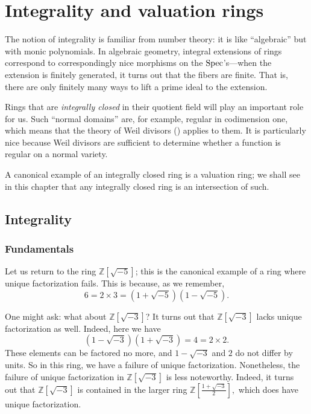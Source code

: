 \chapter{Integrality and valuation rings}

The notion of integrality is familiar from number theory: it is like
``algebraic'' but with monic polynomials. In algebraic geometry, integral
extensions of rings correspond to correspondingly nice morphisms on the
$\operatorname{Spec}$'s---when the extension is finitely generated, it turns out that the
fibers are finite. That is, there are only finitely many ways to lift a prime
ideal to the extension.

Rings that are \emph{integrally closed} in their quotient field will play an
important role for us. Such ``normal domains'' are, for example, regular in
codimension one, which means that the theory of Weil divisors (\rref{}) applies
to them. It is particularly nice because Weil divisors are sufficient to
determine whether a function is regular on a normal variety.

A canonical example of an integrally closed ring is a valuation ring; we shall
see in this chapter that any integrally closed ring is an intersection of such.

\section{Integrality}

\subsection{Fundamentals}

Let us return to the ring $\mathbb{Z}[\sqrt{-5}]$; this is the canonical
example of a ring where unique factorization fails. This is because, as we
remember,
\[ 6 = 2 \times 3 = (1+\sqrt{-5})(1-\sqrt{-5}).  \]

One might ask: what about $\mathbb{Z}[\sqrt{-3}]$? It turns out that
$\mathbb{Z}[\sqrt{-3}]$ lacks unique factorization as well. Indeed, here we have
\[ (1 - \sqrt{-3})(1+\sqrt{-3}) = 4 = 2 \times 2.  \]
These elements can be factored no more, and $1 - \sqrt{-3}$ and $2$ do not
differ by units.
So in this ring, we have a failure of unique factorization. Nonetheless, the
failure of unique factorization in $\mathbb{Z}[\sqrt{-3}]$ is less
noteworthy. Indeed, it turns out that $\mathbb{Z}[\sqrt{-3}]$ is
contained in the larger ring
\( \mathbb{Z}\left[ \frac{1 + \sqrt{-3}}{2}\right],  \)
which does have unique factorization.

